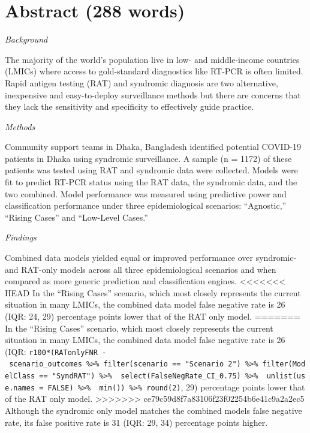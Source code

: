 \documentclass[]{elsarticle} %
\begin{document}
\hypertarget{abstract-288-words}{%
\section{Abstract (288 words)}\label{abstract-288-words}}

\emph{Background}

The majority of the world's population live in low- and middle-income countries (LMICs) where access to gold-standard diagnostics like RT-PCR is often limited.
Rapid antigen testing (RAT) and syndromic diagnosis are two alternative, inexpensive and easy-to-deploy surveillance methods but there are concerns that they lack the sensitivity and specificity to effectively guide practice.

\emph{Methods}

Community support teams in Dhaka, Bangladesh identified potential COVID-19 patients in Dhaka using syndromic surveillance.
A sample (n = 1172) of these patients was tested using RAT and syndromic data were collected.
Models were fit to predict RT-PCR status using the RAT data, the syndromic data, and the two combined.
Model performance was measured using predictive power and classification performance under three epidemiological scenarios: ``Agnostic,'' ``Rising Cases'' and ``Low-Level Cases.''

\emph{Findings}

Combined data models yielded equal or improved performance over syndromic- and RAT-only models across all three epidemiological scenarios and when compared as more generic prediction and classification engines.
\textless\textless\textless\textless\textless\textless\textless{} HEAD
In the ``Rising Cases'' scenario, which most closely represents the current situation in many LMICs, the combined data model false negative rate is 26 (IQR: 24, 29) percentage points lower that of the RAT only model.
=======
In the ``Rising Cases'' scenario, which most closely represents the current situation in many LMICs, the combined data model false negative rate is 26 (IQR: \texttt{r100*(RATonlyFNR\ -\ scenario\_outcomes\ \%\textgreater{}\%\ filter(scenario\ ==\ "Scenario\ 2")\ \%\textgreater{}\%\ filter(ModelClass\ ==\ "SyndRAT")\ \%\textgreater{}\%\ \ select(FalseNegRate\_CI\_0.75)\ \%\textgreater{}\%\ \ unlist(use.names\ =\ FALSE)\ \%\textgreater{}\%\ \ min())\ \%\textgreater{}\%\ round(2)}, 29) percentage points lower that of the RAT only model.
\textgreater\textgreater\textgreater\textgreater\textgreater\textgreater\textgreater{} ce79c59d8f7a83106f23f02254b6e41c9a2a2ec5
Although the syndromic only model matches the combined models false negative rate, its false positive rate is 31 (IQR: 29, 34) percentage points higher.
\end{document}
